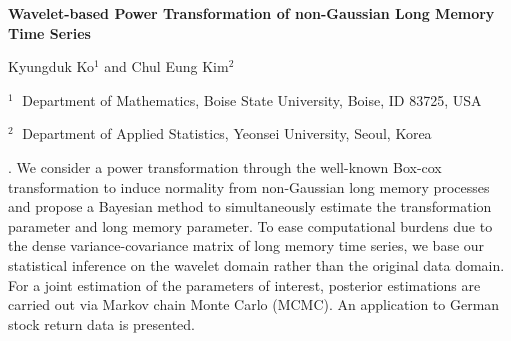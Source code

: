 \documentclass[12pt]{article}
\begin{document}
\begin{flushleft}


{\LARGE\bf Wavelet-based Power Transformation of non-Gaussian Long Memory Time Series}


\vspace{1.0cm}

Kyungduk Ko$^1$ and Chul Eung Kim$^2$

\begin{description}

\item $^1 \;$ Department of Mathematics, Boise State University, Boise, ID 83725, USA

\item $^2 \;$ Department of Applied Statistics, Yeonsei University, Seoul, Korea

\end{description}

\end{flushleft}


\vspace{0.75cm}

. We consider a power transformation through the well-known Box-cox transformation to induce normality from non-Gaussian long memory processes and propose a Bayesian method to simultaneously  estimate the transformation parameter and long memory parameter. To ease computational burdens due to the dense variance-covariance matrix of long memory time series, we base our statistical inference on the wavelet domain rather than the original data domain. For a joint estimation of the parameters of interest, posterior estimations are carried out via Markov chain Monte Carlo (MCMC). An application to German stock return data is presented.  
\vskip 2mm
\end{document}
